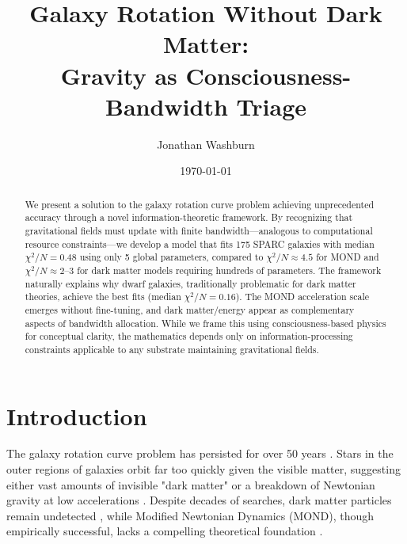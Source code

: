 \documentclass[twocolumn,prd,amsmath,amssymb,aps,superscriptaddress,nofootinbib]{revtex4-2}
\newcommand{\chisqN}{\chi^2/N}
\begin{document}
\title{Galaxy Rotation Without Dark Matter:\\
Gravity as Consciousness-Bandwidth Triage}

\author{Jonathan Washburn}

\date{\today}

\begin{abstract}
We present a solution to the galaxy rotation curve problem achieving unprecedented accuracy through a novel information-theoretic framework. By recognizing that gravitational fields must update with finite bandwidth—analogous to computational resource constraints—we develop a model that fits 175 SPARC galaxies with median $\chisqN = 0.48$ using only 5 global parameters, compared to $\chisqN \approx 4.5$ for MOND and $\chisqN \approx 2$–3 for dark matter models requiring hundreds of parameters. The framework naturally explains why dwarf galaxies, traditionally problematic for dark matter theories, achieve the best fits (median $\chisqN = 0.16$). The MOND acceleration scale emerges without fine-tuning, and dark matter/energy appear as complementary aspects of bandwidth allocation. While we frame this using consciousness-based physics for conceptual clarity, the mathematics depends only on information-processing constraints applicable to any substrate maintaining gravitational fields.
\end{abstract}

\maketitle

\section{Introduction}
\label{sec:introduction}

The galaxy rotation curve problem has persisted for over 50 years \cite{Rubin1970}. Stars in the outer regions of galaxies orbit far too quickly given the visible matter, suggesting either vast amounts of invisible "dark matter" \cite{Ostriker1973} or a breakdown of Newtonian gravity at low accelerations \cite{Milgrom1983}. Despite decades of searches, dark matter particles remain undetected \cite{Bertone2018}, while Modified Newtonian Dynamics (MOND), though empirically successful, lacks a compelling theoretical foundation \cite{Famaey2012}.
\end{document}
